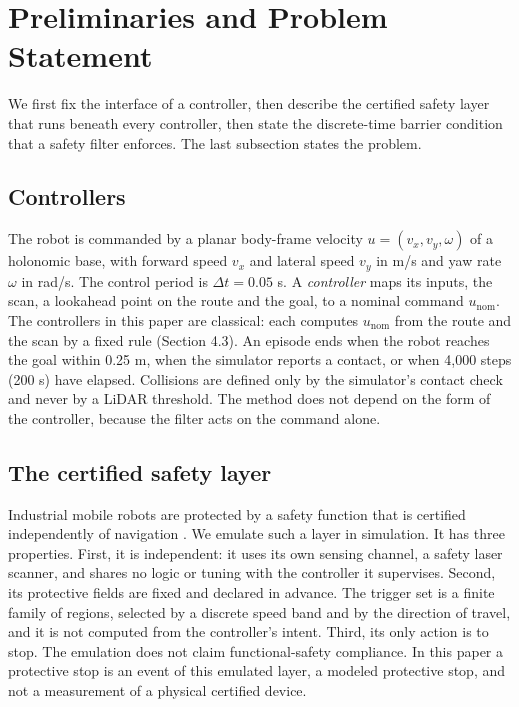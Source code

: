 \section{Preliminaries and Problem Statement}

We first fix the interface of a controller, then describe the certified safety layer that runs beneath every controller, then state the discrete-time barrier condition that a safety filter enforces. The last subsection states the problem.

\subsection{Controllers}

The robot is commanded by a planar body-frame velocity $u = (v_x, v_y, \omega)$ of a holonomic base, with forward speed $v_x$ and lateral speed $v_y$ in m/s and yaw rate $\omega$ in rad/s. The control period is $\Delta t = 0.05$ s. A \emph{controller} maps its inputs, the scan, a lookahead point on the route and the goal, to a nominal command $u_{\mathrm{nom}}$. The controllers in this paper are classical: each computes $u_{\mathrm{nom}}$ from the route and the scan by a fixed rule (Section 4.3). An episode ends when the robot reaches the goal within 0.25 m, when the simulator reports a contact, or when 4,000 steps (200 s) have elapsed. Collisions are defined only by the simulator's contact check and never by a LiDAR threshold. The method does not depend on the form of the controller, because the filter acts on the command alone.

\subsection{The certified safety layer}

Industrial mobile robots are protected by a safety function that is certified independently of navigation \cite{iso3691-4,iec61496-3}. We emulate such a layer in simulation. It has three properties. First, it is independent: it uses its own sensing channel, a safety laser scanner, and shares no logic or tuning with the controller it supervises. Second, its protective fields are fixed and declared in advance. The trigger set is a finite family of regions, selected by a discrete speed band and by the direction of travel, and it is not computed from the controller's intent. Third, its only action is to stop. The emulation does not claim functional-safety compliance. In this paper a protective stop is an event of this emulated layer, a modeled protective stop, and not a measurement of a physical certified device.


